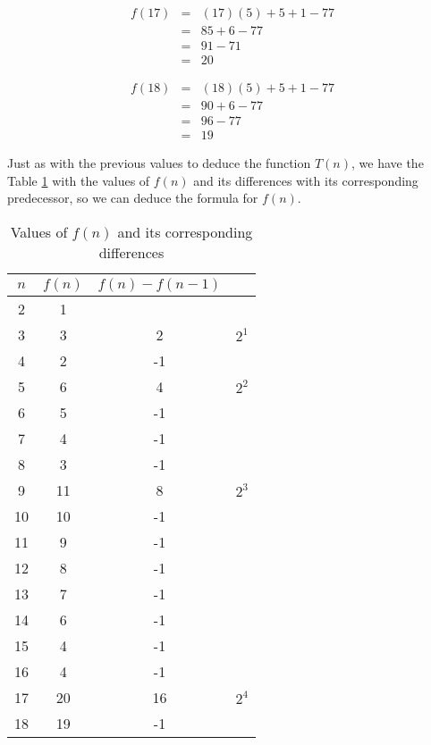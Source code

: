 \documentclass[12pt]{scrartcl}
\begin{document}
\begin{enumerate}
	\begin{eqnarray}
		f(17)		&	=	& 	(17)(5)  + 5 + 1 - 77\nonumber \\
				&	=	&	85 + 6 - 77 \nonumber \\
				&	=	&	91 - 71 \nonumber \\
				&	=	&	20 \nonumber
	\end{eqnarray}
	
	\begin{eqnarray}
		f(18)		&	=	& 	(18)(5)  + 5 + 1 - 77\nonumber \\
				&	=	&	90 + 6 - 77 \nonumber \\
				&	=	&	96 - 77 \nonumber \\
				&	=	&	19 \nonumber
	\end{eqnarray}
	
	Just as with the previous values to deduce the function $T(n)$, we have the Table \ref{valuesOfFn} with the values of $f(n)$ and its differences with its corresponding predecessor, so we can deduce the formula for $f(n)$.
	
	\begin{table}
	\centering
	\caption{Values of $f(n)$ and its corresponding differences}
	\label{valuesOfFn}
		\begin{tabular}{|cccc|}
		\hline
			$n$		&	$f(n)$	&	$f(n) - f(n - 1)$	&	 \\
			\hline
			2		&	1		&				&\\
			3		&	3		&		2		&	$2^1$	\\	
			4		&	2		&		-1		&	\\
			5		&	6		&		4		&	$2^2$	\\
			6		&	5		&		-1		&	\\
			7		&	4		&		-1		&	\\
			8		&	3		&		-1		&	\\
			9		&	11		&		8		&	$2^3$	\\	
			10		&	10		&		-1		&	\\
			11		&	9		&		-1		&	\\
			12		&	8		&		-1		&	\\
			13		&	7		&		-1		&	\\
			14		&	6		&		-1		&	\\
			15		&	4		&		-1		&	\\
			16		&	4		&		-1		&	\\
			17		&	20		&		16		&	$2^4$	\\	
			18		&	19		&		-1		&	\\
		\hline
		\end{tabular}
	\end{table}
		

\end{enumerate}
\end{document}
